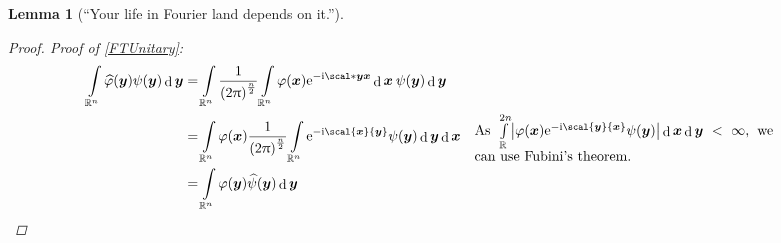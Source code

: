 \documentclass[10pt]{article}
\newtheorem*{lemma}{Lemma}
\DeclarePairedDelimiter\abs{\lvert}{\rvert}
\DeclarePairedDelimiter\of{\lparen}{\rparen}
\newcommand{\R}{\mathbb{R}}
\newcommand{\Rn}{{\R^n}}
\DeclareMathOperator{\diffd}{d}
\newcommand\gj\varphi
\newcommand\gy\psi
\newcommand{\bx}{{\vectorsym x}}
\newcommand{\by}{{\vectorsym y}}
\newcommand\ft\widehat
\newcommand\Int[1]{\int\limits_#1}
\newcommand\commentbox[1]{\parbox{7.5cm}{#1}}
\newcommand\I{\mathrm{i}}
\newcommand\E{\mathrm{e}}
\begin{document}
\begin{lemma}[``Your life in Fourier land depends on it.'']
\begin{proof}
      Proof of \ref{FTUnitary}:
      \begin{align*}
        \Int\Rn\ft\gj\of*\by \gy\of*\by \diffd\by
        &= \Int\Rn\frac{1}{\of*{2\pi}^\frac{n}{2}}\Int\Rn\gj\of*\bx
          \E^{-\I\scal*\by\bx}\diffd\bx\:\gy\of*\by\diffd\by \\
        &= \Int\Rn\gj\of*\bx\frac{1}{\of*{2\pi}^\frac{n}{2}}\Int\Rn
          \E^{-\I\scal\bx\by}\gy\of*\by\diffd\by\diffd\bx
          && \commentbox{As $\Int{\R^{2n}}\abs*{\gj\of*\bx
          \E^{-\I\scal\by\bx}\gy\of*\by}\diffd\bx\diffd\by<\infty$,
          we can use Fubini's theorem.} \\
        &=\Int\Rn\gj\of*\by \ft\gy\of*\by \diffd\by
      \end{align*}
      
      
    \end{proof}
  \end{lemma}
  
\end{document}
